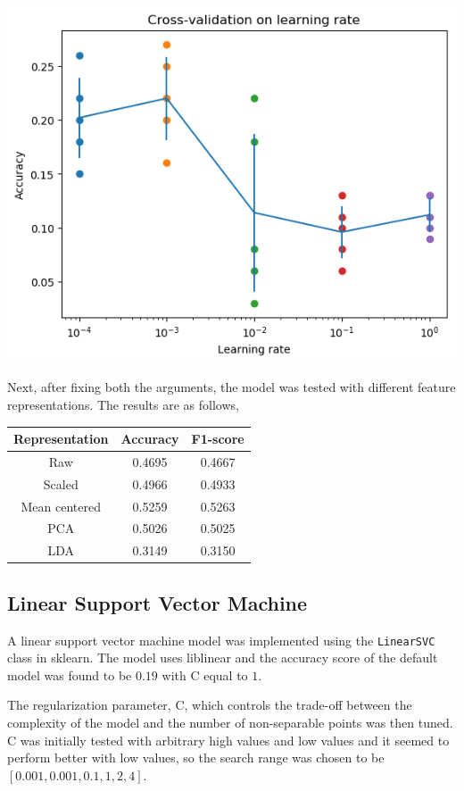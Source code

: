 \documentclass[12pt]{article}
\begin{document}
\begin{center}
\includegraphics[scale=0.6]{mlp-lr.png}
\end{center}

Next, after fixing both the arguments, the model was tested with different feature representations. The results are as follows,

\begin{center}
  \begin{tabular}{|c|c|c|}
    \hline
    Representation & Accuracy & F1-score \\
    \hline
    Raw & 0.4695 & 0.4667\\
    Scaled & 0.4966 & 0.4933 \\
    Mean centered & 0.5259 & 0.5263\\
    PCA & 0.5026 & 0.5025\\
    LDA & 0.3149 & 0.3150 \\
    \hline
  \end{tabular}
\end{center}


\subsection*{Linear Support Vector Machine}

A linear support vector machine model was implemented using the \texttt{LinearSVC} class in sklearn. The model uses liblinear and the accuracy score of the default model was found to be $0.19$ with C equal to $1$.

The regularization parameter, C, which controls the trade-off between the complexity of the model and the number of non-separable points was then tuned. C was initially tested with arbitrary high values and low values and it seemed to perform better with low values, so the search range was chosen to be $[0.001,0.001,0.1,1,2,4]$.
\end{document}
